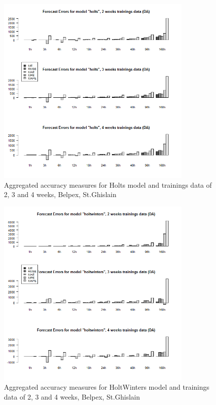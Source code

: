 \begin{figure}[!ht]
	\centering
		\includegraphics[width=0.85\textwidth]{figures/appendix_forecast_results/da_sim_2_x_1w_1w_holts.png}
	\caption{Aggregated accuracy measures for Holts model and trainings data of 2, 3 and 4 weeks, Belpex, St.Ghislain}
	\label{fig:app_da_sim_2_x_1w_1w_holts}
	\vspace*{-1.6in}
\end{figure}




\begin{figure}[!ht]
	\centering
	\vspace*{-1.2in}
		\includegraphics[width=0.85\textwidth]{figures/appendix_forecast_results/da_sim_2_x_1w_1w_holtwinters.png}
	\caption{Aggregated accuracy measures for HoltWinters model and trainings data of 2, 3 and 4 weeks, Belpex, St.Ghislain}
	\label{fig:app_da_sim_2_x_1w_1w_holtwinters}
\end{figure}

